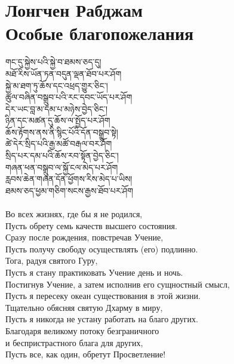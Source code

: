 \section{Лонгчен Рабджам \\ Особые благопожелания}
\vspace{0.8cm}
\ti
གང་དུ་སྐྱེས་པའི་སྐྱེ་བ་ཐམས་ཅད་དུ།\\
མཐོ་རིས་ཡོན་ཏན་བདུན་ལྡན་ཐོབ་པར་ཤོག\\
སྐྱེ་མ་ཐག་ཏུ་ཆོས་དང་འཕྲད་གྱུར་ཅིང༌།\\
ཚུལ་བཞིན་བསྒྲུབ་པའི་རང་དབང་ཡོད་པར་ཤོག\\
དེར་ཡང་བླ་མ་དམ་པ་མཉེས་བྱེད་ཅིང༌། \\
ཉིན་དང་མཚན་དུ་ཆོས་ལ་སྤྱོད་པར་ཤོག\\
ཆོས་རྟོགས་ནས་ནི་སྙིང་པོའི་དོན་བསྒྲུབ་སྟེ།\\
ཚེ་དེར་སྲིད་པའི་རྒྱ་མཚོ་བརྒལ་བར་ཤོག \\
སྲིད་པར་དམ་པའི་ཆོས་རབ་སྟོན་བྱེད་ཅིང༌།\\
གཞན་ཕན་བསྒྲུབ་ལ་སྐྱོ་ངལ་མེད་པར་ཤོག\\
རླབས་ཆེན་གཞན་དོན་ཕྱོགས་རིས་མེད་པ་ཡིས།\\
ཐམས་ཅད་ཕྱམ་གཅིག་སངས་རྒྱས་ཐོབ་པར་ཤོག\\
\\
\ru Во всех жизнях, где бы я не родился,\\
Пусть обрету семь качеств высшего состояния.\\
Сразу после рождения, повстречав Учение,\\
Пусть получу свободу осуществлять (его) подлинно.\\
Тога, радуя святого Гуру,\\
Пусть я стану практиковать Учение день и ночь.\\
Постигнув Учение, а затем исполнив его сущностный смысл,\\
Пусть я пересеку океан существования в этой жизни.\\
Тщательно обясняя святую Дхарму в миру,\\
Пусть я никогда не устану работать на благо других.\\
Благодаря великому потоку безграничного\\
и беспристрастного блага для других,\\
Пусть все, как один, обретут Просветление!\\
\\
\newpage